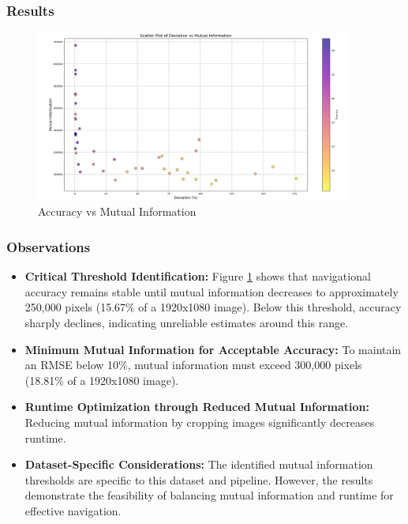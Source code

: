 \subsubsection{Results}


\begin{figure}[H]
    \centering
    \includegraphics[width=0.93\textwidth]{Chapter 5/RESULTPLOTS/mutual/accmutual.png}
    \caption{Accuracy vs Mutual Information}
    \label{fig:Accuracy_Mutual}
\end{figure}


\subsubsection{Observations}

\begin{itemize}
    \item \textbf{Critical Threshold Identification:} Figure \ref{fig:Accuracy_Mutual} shows that navigational accuracy remains stable until mutual information decreases to approximately 250,000 pixels (15.67\% of a 1920x1080 image). Below this threshold, accuracy sharply declines, indicating unreliable estimates around this range.
    
    \item \textbf{Minimum Mutual Information for Acceptable Accuracy:} To maintain an RMSE below 10\%, mutual information must exceed 300,000 pixels (18.81\% of a 1920x1080 image). 
    
    \item \textbf{Runtime Optimization through Reduced Mutual Information:} Reducing mutual information by cropping images significantly decreases runtime.
    
    \item \textbf{Dataset-Specific Considerations:} The identified mutual information thresholds are specific to this dataset and pipeline. However, the results demonstrate the feasibility of balancing mutual information and runtime for effective navigation.
\end{itemize}

